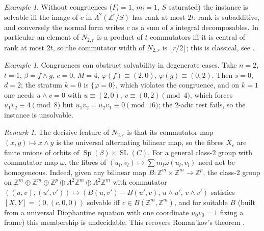 \documentclass[11pt]{amsart}
\theoremstyle{definition}
\theoremstyle{remark}
\newtheorem{remark}[theorem]{Remark}
\newtheorem{example}[theorem]{Example}
\newcommand{\Z}{\mathbb{Z}}
\newcommand{\w}{\wedge}
\newcommand{\Sp}{\operatorname{Sp}}
\newcommand{\SL}{\operatorname{SL}}
\begin{document}
\begin{example}
Without congruences ($F_l=1$, $m_l=1$, $S$ saturated) the instance is solvable iff
the image of $c$ in $\Lambda^2(\Z^r/S)$ has rank at most $2t$: rank is subadditive,
and conversely the normal form writes $c$ as a sum of $s$ integral decomposables.
In particular an element of $N_{2,r}$ is a product of $t$ commutators iff it is
central of rank at most $2t$, so the commutator width of $N_{2,r}$ is
$\lfloor r/2\rfloor$; this is classical, see \cite{AR,Rom16b}.
\end{example}

\begin{example}
Congruences can obstruct solvability in degenerate cases. Take $n=2$, $t=1$,
$\beta=f\w g$, $c=0$, $M=4$, $\varphi(f)\equiv(2,0)$, $\varphi(g)\equiv(0,2)$. Then
$s=0$, $d=2$; the stratum $k=0$ is $\{\varphi=0\}$, which violates the congruence,
and on $k=1$ one needs $u\w v=0$ with $u\equiv(2,0)$, $v\equiv(0,2)\pmod4$, which
forces $u_1v_2\equiv4\pmod 8$ but $u_1v_2=u_2v_1\equiv0\pmod{16}$; the $2$-adic test
fails, so the instance is unsolvable.
\end{example}

\begin{remark}\label{rem:contrast}
The decisive feature of $N_{2,r}$ is that its commutator map
$(x,y)\mapsto x\w y$ is the universal alternating bilinear map, so the fibres
$X_c$ are finite unions of orbits of $\Sp(\beta)\times\SL(C)$. For a general
class-$2$ group with commutator map $\omega$, the fibres of
$(u_l,v_l)\mapsto\sum m_l\omega(u_l,v_l)$ need not be homogeneous. Indeed, given any
bilinear map $B\colon\Z^m\times\Z^m\to\Z^p$, the class-$2$ group on
$\Z^m\oplus\Z^m\oplus\Z^p\oplus\Lambda^2\Z^m\oplus\Lambda^2\Z^m$ with commutator
$((u,v),(u',v'))\mapsto(B(u,v')-B(u',v),\,u\w u',\,v\w v')$ satisfies
$[X,Y]=(0,(c,0,0))$ solvable iff $c\in B(\Z^m,\Z^m)$, and for suitable $B$ (built from
a universal Diophantine equation with one coordinate $u_0v_0=1$ fixing a frame)
this membership is undecidable. This recovers Roman'kov's theorem \cite{Rom16a}.
\end{remark}
\end{document}
